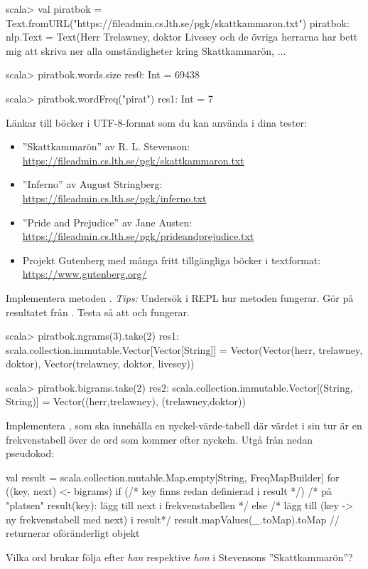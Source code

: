 \begin{REPL}[basicstyle=\color{white}\ttfamily\fontsize{9}{11}\selectfont]
scala> val piratbok = Text.fromURL("https://fileadmin.cs.lth.se/pgk/skattkammaron.txt")
piratbok: nlp.Text = Text(Herr Trelawney, doktor Livesey och de övriga herrarna har bett mig att skriva ner alla omständigheter kring Skattkammarön, ...

scala> piratbok.words.size
res0: Int = 69438

scala> piratbok.wordFreq("pirat")
res1: Int = 7
\end{REPL}
Länkar till böcker i UTF-8-format som du kan använda i dina tester:
\begin{itemize}%
\item ''Skattkammarön'' av R. L. Stevenson: \\\url{https://fileadmin.cs.lth.se/pgk/skattkammaron.txt}
\item ''Inferno'' av August Stringberg: \\\url{https://fileadmin.cs.lth.se/pgk/inferno.txt}
\item ''Pride and Prejudice'' av Jane Austen: \\\url{https://fileadmin.cs.lth.se/pgk/prideandprejudice.txt}
\item Projekt Gutenberg med många fritt tillgängliga böcker i textformat: \\\url{https://www.gutenberg.org/}
\end{itemize}
 


\Task Implementera metoden . \emph{Tips:} Undersök i REPL hur metoden  fungerar. Gör  på resultatet från . Testa så att  och  fungerar.
\begin{REPL}
scala> piratbok.ngrams(3).take(2)
res1: scala.collection.immutable.Vector[Vector[String]] = 
Vector(Vector(herr, trelawney, doktor), Vector(trelawney, doktor, livesey))

scala> piratbok.bigrams.take(2)
res2: scala.collection.immutable.Vector[(String, String)] = 
Vector((herr,trelawney), (trelawney,doktor))
\end{REPL}

\Task Implementera , som ska innehålla en nyckel-värde-tabell där värdet i sin tur är en frekvenstabell över de ord som kommer efter nyckeln. Utgå från nedan pseudokod: 
\begin{Code}
val result = scala.collection.mutable.Map.empty[String, FreqMapBuilder]
for ((key, next) <- bigrams) { 
  if (/* key finns redan definierad i result */)
    /* på "platsen" result(key): lägg till next i frekvenstabellen */
  else 
    /* lägg till (key -> ny frekvenstabell med next) i result*/ 
}
result.mapValues(_.toMap).toMap // returnerar oföränderligt objekt
\end{Code}
\Subtask Vilka ord brukar följa efter \emph{han} respektive \emph{hon} i Stevensons ''Skattkammarön''?

